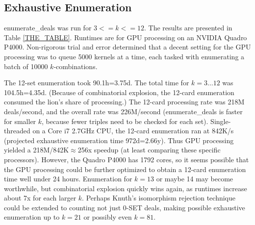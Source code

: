 \documentclass[10pt]{amsart}
\newcommand{\EDb}{{\sc enumerate\_deals }}
\begin{document}
\subsection{Exhaustive Enumeration}
\EDb was run for $3<=k<=12$. The results are presented in Table
\ref{THE_TABLE}. Runtimes are for GPU processing on an NVIDIA Quadro
P4000. Non-rigorous trial and error determined that a decent setting for the GPU
processing was to queue 5000 kernels at a time, each tasked with enumerating a
batch of 10000 $k$-combinations.

The 12-set enumeration took 90.1h=3.75d. The total time for $k=3\ldots 12$ was
104.5h=4.35d. (Because of combinatorial explosion, the 12-card enumeration
consumed the lion's share of processing.) The 12-card processing rate was 218M
deals/second, and the overall rate was 226M/second (\EDb is faster for smaller
$k$, because fewer triples need to be checked for each set). Single-threaded on
a Core i7 2.7GHz CPU, the 12-card enumeration ran at 842K/s (projected
exhaustive enumeration time 972d=2.66y). Thus GPU processing yielded a
218M/842K$\approx$256x speedup (at least comparing these specific processors).
However, the Quadro P4000 has 1792 cores, so it seems possible that the GPU
processing could be further optimized to obtain a 12-card enumeration time well
under 24 hours. Enumeration for $k=13$ or maybe 14 may become worthwhile, but
combinatorial explosion quickly wins again, as runtimes increase about 7x for
each larger $k$. Perhaps Knuth's isomorphism rejection technique could be
extended to counting not just 0-SET deals, making possible exhaustive
enumeration up to $k=21$ or possibly even $k=81$.
\end{document}
